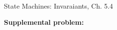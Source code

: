 \documentclass[handout]{mcs}
\begin{document}

\begin{staffnotes}
State Machines: Invaraiants, Ch. 5.4
\end{staffnotes}





\textbf{Supplemental problem:}



\end{document}
